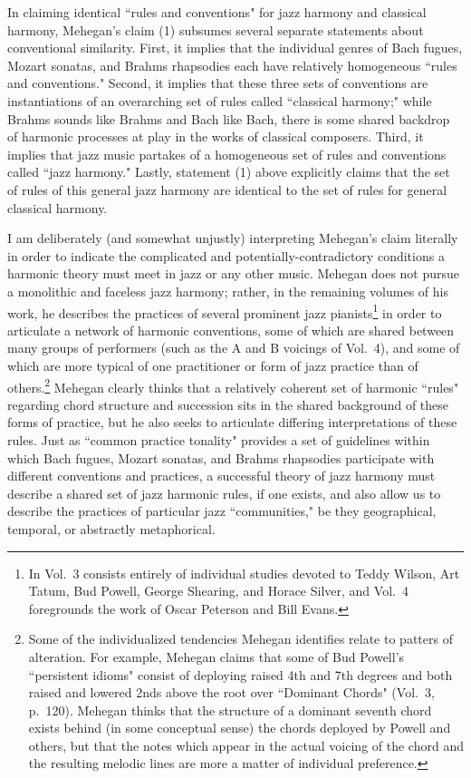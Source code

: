 In claiming identical ``rules and conventions" for jazz harmony and classical harmony, Mehegan's claim (1) subsumes several separate statements about conventional similarity.  First, it implies that the individual genres of Bach fugues, Mozart sonatas, and Brahms rhapsodies each have relatively homogeneous ``rules and conventions."  Second, it implies that these three sets of conventions are instantiations of an overarching set of rules called ``classical harmony;" while Brahms sounds like Brahms and Bach like Bach, there is some shared backdrop of harmonic processes at play in the works of classical composers.  Third, it implies that jazz music partakes of a homogeneous set of rules and conventions called ``jazz harmony."  Lastly, statement (1) above explicitly claims that the set of rules of this general jazz harmony are identical to the set of rules for general classical harmony.

I am deliberately (and somewhat unjustly) interpreting Mehegan's claim literally in order to indicate the complicated and potentially-contradictory conditions a harmonic theory must meet in jazz or any other music.  Mehegan does not pursue a monolithic and faceless jazz harmony; rather, in the remaining volumes of his work, he describes the practices of several prominent jazz pianists\footnote{In Vol.\ 3 consists entirely of individual studies devoted to Teddy Wilson, Art Tatum, Bud Powell, George Shearing, and Horace Silver, and Vol.\ 4 foregrounds the work of Oscar Peterson and Bill Evans.} in order to articulate a network of harmonic conventions, some of which are shared between many groups of performers (such as the A and B voicings of Vol.\ 4), and some of which are more typical of one practitioner or form of jazz practice than of others.\footnote{Some of the individualized tendencies Mehegan identifies relate to patters of alteration.  For example, Mehegan claims that some of Bud Powell's ``persistent idioms" consist of deploying raised 4th and 7th degrees and both raised and lowered 2nds above the root over ``Dominant Chords" (Vol.\ 3, p.\ 120).  Mehegan thinks that the structure of a dominant seventh chord exists behind (in some conceptual sense) the chords deployed by Powell and others, but that the notes which appear in the actual voicing of the chord and the resulting melodic lines are more a matter of individual preference.}  Mehegan clearly thinks that a relatively coherent set of harmonic ``rules" regarding chord structure and succession sits in the shared background of these forms of practice, but he also seeks to articulate differing interpretations of these rules.  Just as ``common practice tonality" provides a set of guidelines within which Bach fugues, Mozart sonatas, and Brahms rhapsodies participate with different conventions and practices, a successful theory of jazz harmony must describe a shared set of jazz harmonic rules, if one exists, and also allow us to describe the practices of particular jazz ``communities," be they geographical, temporal, or abstractly metaphorical.

